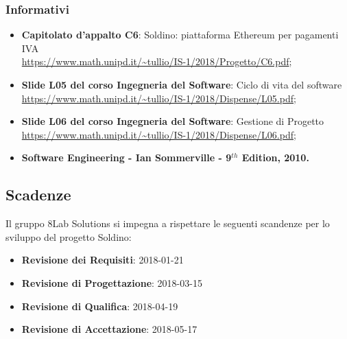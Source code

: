 \subsubsection{Informativi}
\begin{itemize}
	\item \textbf{Capitolato d'appalto C6}: Soldino: piattaforma Ethereum per pagamenti IVA \\
	\url{https://www.math.unipd.it/~tullio/IS-1/2018/Progetto/C6.pdf};
	\item \textbf{Slide L05 del corso Ingegneria del Software}: Ciclo di vita 
	del software \\
	\url{https://www.math.unipd.it/~tullio/IS-1/2018/Dispense/L05.pdf};
	\item \textbf{Slide L06 del corso Ingegneria del Software}: Gestione di 
	Progetto \\
	\url{https://www.math.unipd.it/~tullio/IS-1/2018/Dispense/L06.pdf};
	\item \textbf{Software Engineering - Ian Sommerville - 9$^{th}$ Edition, 
	2010.}
\end{itemize}

\hypertarget{scadenze}{\subsection{Scadenze}}
Il gruppo 8Lab Solutions si impegna a rispettare le seguenti scandenze per lo 
sviluppo del progetto Soldino:

\begin{itemize}
	\item \textbf{Revisione dei Requisiti}: 2018-01-21
	\item \textbf{Revisione di Progettazione}: 2018-03-15
	\item \textbf{Revisione di Qualifica}: 2018-04-19
	\item \textbf{Revisione di Accettazione}: 2018-05-17
\end{itemize}